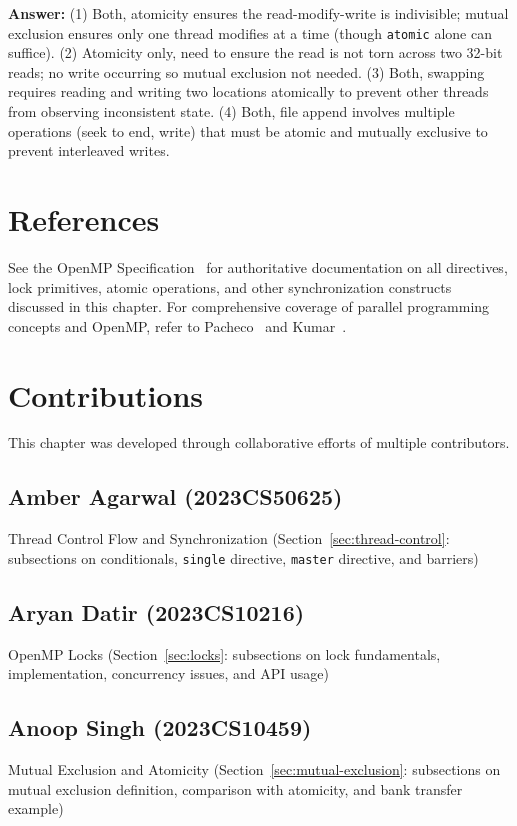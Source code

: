 \begin{ppexercises}
  \textbf{Answer:} (1) Both, atomicity ensures the read-modify-write is indivisible; mutual exclusion ensures only one thread modifies at a time (though \texttt{atomic} alone can suffice). (2) Atomicity only, need to ensure the read is not torn across two 32-bit reads; no write occurring so mutual exclusion not needed. (3) Both, swapping requires reading and writing two locations atomically to prevent other threads from observing inconsistent state. (4) Both, file append involves multiple operations (seek to end, write) that must be atomic and mutually exclusive to prevent interleaved writes.
\end{ppexercises}

\section*{References}
See the OpenMP Specification~\cite{openmp-spec} for authoritative documentation on all directives, lock primitives, atomic operations, and other synchronization constructs discussed in this chapter. For comprehensive coverage of parallel programming concepts and OpenMP, refer to Pacheco~\cite{pacheco2011} and Kumar~\cite{kumar-parallel}.

\section*{Contributions}

This chapter was developed through collaborative efforts of multiple contributors.

\subsection*{Amber Agarwal (2023CS50625)}
Thread Control Flow and Synchronization (Section~\ref{sec:thread-control}: subsections on conditionals, \texttt{single} directive, \texttt{master} directive, and barriers)

\subsection*{Aryan Datir (2023CS10216)}
OpenMP Locks (Section~\ref{sec:locks}: subsections on lock fundamentals, implementation, concurrency issues, and API usage)

\subsection*{Anoop Singh (2023CS10459)}
Mutual Exclusion and Atomicity (Section~\ref{sec:mutual-exclusion}: subsections on mutual exclusion definition, comparison with atomicity, and bank transfer example)

